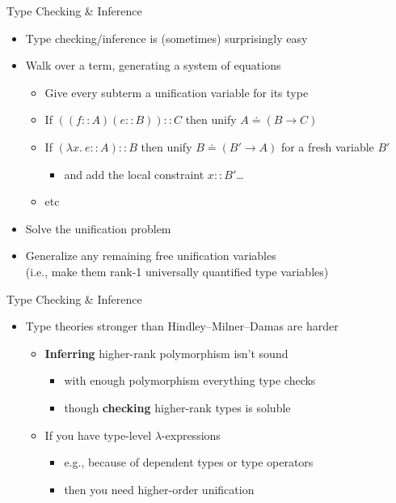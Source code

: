 \documentclass[pdf,fyma2]{prosper} %
\newcommand{\hilighten}[1]{{\color{fymablue}#1}}
\renewcommand{\emph}[1]{\hilighten{\textbf{#1}}}
\begin{document}
\begin{slide}{Type Checking \& Inference}
	\vspace{1em}
	\begin{itemize}
	\item Type checking/inference is (sometimes) surprisingly easy
	\item Walk over a term, generating a system of equations
        \begin{itemize}
        \item Give every subterm a unification variable for its type
        \item If $((f :: A) (e :: B)) :: C$ then unify $A \doteq (B \to C)$
        \item If $(\lambda x.~ e :: A) :: B$ then unify $B \doteq (B' \to A)$ for a fresh variable $B'$
            \begin{itemize}
            \item and add the local constraint $x :: B'$\ldots
            \end{itemize}
        \item etc
        \end{itemize}
    \item Solve the unification problem
    \item Generalize any remaining free unification variables
        \\ (i.e., make them rank-1 universally quantified type variables)
	\end{itemize}
\end{slide}

\begin{slide}{Type Checking \& Inference}
	\vspace{1em}
	\begin{itemize}
	\item Type theories stronger than Hindley--Milner--Damas are harder
	\vspace{1em}
        \begin{itemize}
        \item \emph{Inferring} higher-rank polymorphism isn't sound
            \begin{itemize}
            \item with enough polymorphism everything type checks
            \item though \emph{checking} higher-rank types is soluble
            \end{itemize}
	\vspace{1em}
        \item If you have type-level $\lambda$-expressions
            \begin{itemize}
            \item e.g., because of dependent types or type operators
            \item then you need higher-order unification
            \end{itemize}
        \end{itemize}
	\end{itemize}
\end{slide}
\end{document}
